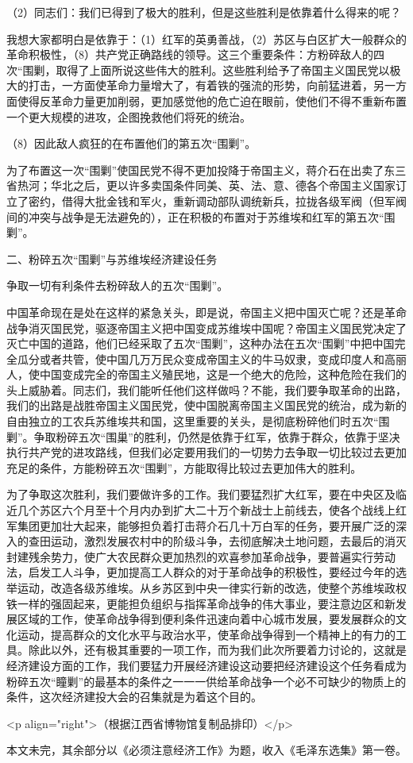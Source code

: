 （2）同志们：我们已得到了极大的胜利，但是这些胜利是依靠着什么得来的呢？

我想大家都明白是依靠于：（1）红军的英勇善战，（2）苏区与白区扩大一般群众的革命积极性，（8）共产党正确路线的领导。这三个重要条件：方粉碎敌人的四次“围剿，取得了上面所说这些伟大的胜利。这些胜利给予了帝国主义国民党以极大的打击，一方面使革命力量增大了，有着铁的强流的形势，向前猛进着，另一方面使得反革命力量更加削弱，更加感觉他的危亡迫在眼前，使他们不得不重新布置一个更大规模的进攻，企图挽救他们将死的统治。

（8）因此敌人疯狂的在布置他们的第五次“围剿”。

为了布置这一次“围剿”使国民党不得不更加投降于帝国主义，蒋介石在出卖了东三省热河；华北之后，更以许多卖国条件同美、英、法、意、德各个帝国主义国家订立了密约，借得大批金钱和军火，重新调动部队调统新兵，拉拢各级军阀（但军阀间的冲突与战争是无法避免的），正在积极的布置对于苏维埃和红军的第五次“围剿”。

二、粉碎五次“围剿”与苏维埃经济建设任务

争取一切有利条件去粉碎敌人的五次“围剿”。

中国革命现在是处在这样的紧急关头，即是说，帝国主义把中国灭亡呢？还是革命战争消灭国民党，驱逐帝国主义把中国变成苏维埃中国呢？帝国主义国民党决定了灭亡中国的道路，他们已经采取了五次“围剿”，这种办法在五次“围剿”中把中国完全瓜分或者共管，使中国几万万民众变成帝国主义的牛马奴隶，变成印度人和高丽人，使中国变成完全的帝国主义殖民地，这是一个绝大的危险，这种危险在我们的头上威胁着。同志们，我们能听任他们这样做吗？不能，我们要争取革命的出路，我们的出路是战胜帝国主义国民党，使中国脱离帝国主义国民党的统治，成为新的自由独立的工农兵苏维埃共和国，这里重要的关头，是彻底粉碎他们时五次“围剿”。争取粉碎五次“围巢”的胜利，仍然是依靠于红军，依靠于群众，依靠于坚决执行共产党的进攻路线，但我们必定要用我们的一切势力去争取一切比较过去更加充足的条件，方能粉碎五次“围剿”，方能取得比较过去更加伟大的胜利。

为了争取这次胜利，我们要做许多的工作。我们要猛烈扩大红军，要在中央区及临近几个苏区六个月至十个月内办到扩大二十万个新战士上前线去，使各个战线上红军集团更加壮大起来，能够担负着打击蒋介石几十万白军的任务，要开展广泛的深入的查田运动，激烈发展农村中的阶级斗争，去彻底解决土地问题，去最后的消灭封建残余势力，使广大农民群众更加热烈的欢喜参加革命战争，要普遍实行劳动法，启发工人斗争，更加提高工人群众的对于革命战争的积极性，要经过今年的选举运动，改造各级苏维埃。从乡苏区到中央一律实行新的改选，使整个苏维埃政权铁一样的强固起来，更能担负组织与指挥革命战争的伟大事业，要注意边区和新发展区域的工作，使革命战争得到便利条件迅速向着中心城市发展，要发展群众的文化运动，提高群众的文化水平与政治水平，使革命战争得到一个精神上的有力的工具。除此以外，还有极其重要的一项工作，而为我们此次所要着力讨论的，这就是经济建设方面的工作，我们要猛力开展经济建设这动要把经济建设这个任务看成为粉碎五次“瞳剿”的最基本的条件之一一一供给革命战争一个必不可缺少的物质上的条件，这次经济建投大会的召集就是为着这个目的。

<p align="right">（根据江西省博物馆复制品排印）</p>

本文未完，其余部分以《必须注意经济工作》为题，收入《毛泽东选集》第一卷。

